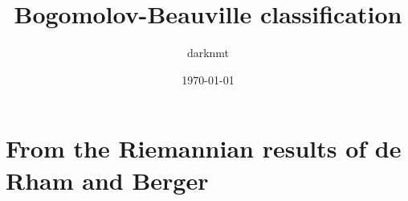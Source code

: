 \documentclass[11pt]{article}
\author{darknmt}
\date{\today}
\title{Bogomolov-Beauville classification}
\begin{document}
\maketitle
\tableofcontents

\iffalse
\begin{info}
The PDF version of this page can be downloaded by replacing \texttt{html} in the its address by
\texttt{pdf}. 
For example \texttt{/html/sheaf-cohomology.html} should become \texttt{/pdf/sheaf-cohomology.pdf}.
\end{info}
\fi

\iffalse
\begin{info}
This post is a part of the \href{../res/Stage2017.pdf}{memoire of my M1 internship} at I2M. The memoire contains,
needless to say, less errors than this page.
\end{info}
\fi

\section{From the Riemannian results of de Rham and Berger}
\label{sec:org8fd1336}
\end{document}
